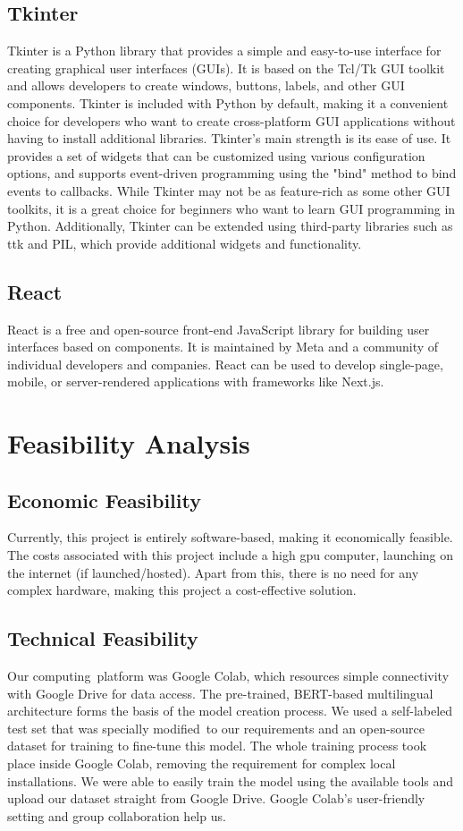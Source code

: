 \subsection{Tkinter}
Tkinter is a Python library that provides a simple and easy-to-use interface for creating 
graphical user interfaces (GUIs). It is based on the Tcl/Tk GUI toolkit and allows 
developers to create windows, buttons, labels, and other GUI components. Tkinter is 
included with Python by default, making it a convenient choice for developers who 
want to create cross-platform GUI applications without having to install additional 
libraries.
Tkinter's main strength is its ease of use. It provides a set of widgets that can be 
customized using various configuration options, and supports event-driven 
programming using the "bind" method to bind events to callbacks. While Tkinter may 
not be as feature-rich as some other GUI toolkits, it is a great choice for beginners who 
want to learn GUI programming in Python. Additionally, Tkinter can be extended using 
third-party libraries such as ttk and PIL, which provide additional widgets and 
functionality.

\subsection{React}
React is a free and open-source front-end JavaScript library for building user interfaces based on components. It is maintained by Meta and a community of individual developers and companies. React can be used to develop single-page, mobile, or server-rendered applications with frameworks like Next.js.

\section{Feasibility Analysis}
\subsection{Economic Feasibility} 
Currently, this project is entirely software-based, making it economically feasible. The 
costs associated with this project include a high gpu computer, launching on the internet (if launched/hosted). Apart from this, there is no need for 
any complex hardware, making this project a cost-effective solution.

\subsection{Technical Feasibility}
Our computing platform was Google Colab, which resources simple connectivity with Google Drive for data access.
The pre-trained, BERT-based multilingual architecture forms the basis of the model creation process. We used a self-labeled test set that was specially modified to our requirements and an open-source dataset for training to fine-tune this model. The whole training process took place inside Google Colab, removing the requirement for complex local installations. We were able to easily train the model using the available tools and upload our dataset straight from Google Drive. Google Colab's user-friendly setting and group collaboration help us.

